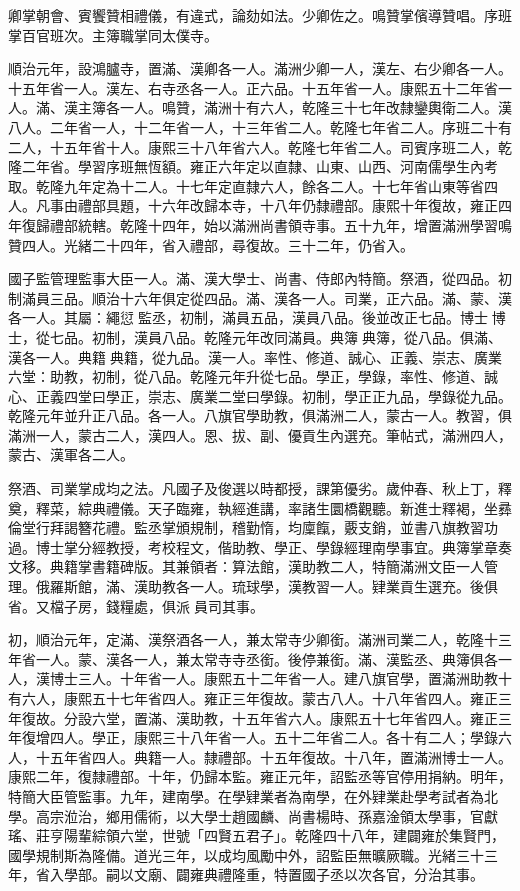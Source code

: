\begin{pinyinscope}
卿掌朝會、賓饗贊相禮儀，有違式，論劾如法。少卿佐之。鳴贊掌儐導贊唱。序班掌百官班次。主簿職掌同太僕寺。

順治元年，設鴻臚寺，置滿、漢卿各一人。滿洲少卿一人，漢左、右少卿各一人。十五年省一人。漢左、右寺丞各一人。正六品。十五年省一人。康熙五十二年省一人。滿、漢主簿各一人。鳴贊，滿洲十有六人，乾隆三十七年改隸鑾輿衛二人。漢八人。二年省一人，十二年省一人，十三年省二人。乾隆七年省二人。序班二十有二人，十五年省十人。康熙三十八年省六人。乾隆七年省二人。司賓序班二人，乾隆二年省。學習序班無恆額。雍正六年定以直隸、山東、山西、河南儒學生內考取。乾隆九年定為十二人。十七年定直隸六人，餘各二人。十七年省山東等省四人。凡事由禮部具題，十六年改歸本寺，十八年仍隸禮部。康熙十年復故，雍正四年復歸禮部統轄。乾隆十四年，始以滿洲尚書領寺事。五十九年，增置滿洲學習鳴贊四人。光緒二十四年，省入禮部，尋復故。三十二年，仍省入。

國子監管理監事大臣一人。滿、漢大學士、尚書、侍郎內特簡。祭酒，從四品。初制滿員三品。順治十六年俱定從四品。滿、漢各一人。司業，正六品。滿、蒙、漢各一人。其屬：繩愆監丞，初制，滿員五品，漢員八品。後並改正七品。博士博士，從七品。初制，漢員八品。乾隆元年改同滿員。典簿典簿，從八品。俱滿、漢各一人。典籍典籍，從九品。漢一人。率性、修道、誠心、正義、崇志、廣業六堂：助教，初制，從八品。乾隆元年升從七品。學正，學錄，率性、修道、誠心、正義四堂曰學正，崇志、廣業二堂曰學錄。初制，學正正九品，學錄從九品。乾隆元年並升正八品。各一人。八旗官學助教，俱滿洲二人，蒙古一人。教習，俱滿洲一人，蒙古二人，漢四人。恩、拔、副、優貢生內選充。筆帖式，滿洲四人，蒙古、漢軍各二人。

祭酒、司業掌成均之法。凡國子及俊選以時都授，課第優劣。歲仲春、秋上丁，釋奠，釋菜，綜典禮儀。天子臨雍，執經進講，率諸生圜橋觀聽。新進士釋褐，坐彞倫堂行拜謁簪花禮。監丞掌頒規制，稽勤惰，均廩餼，覈支銷，並書八旗教習功過。博士掌分經教授，考校程文，偕助教、學正、學錄經理南學事宜。典簿掌章奏文移。典籍掌書籍碑版。其兼領者：算法館，漢助教二人，特簡滿洲文臣一人管理。俄羅斯館，滿、漢助教各一人。琉球學，漢教習一人。肄業貢生選充。後俱省。又檔子房，錢糧處，俱派員司其事。

初，順治元年，定滿、漢祭酒各一人，兼太常寺少卿銜。滿洲司業二人，乾隆十三年省一人。蒙、漢各一人，兼太常寺寺丞銜。後停兼銜。滿、漢監丞、典簿俱各一人，漢博士三人。十年省一人。康熙五十二年省一人。建八旗官學，置滿洲助教十有六人，康熙五十七年省四人。雍正三年復故。蒙古八人。十八年省四人。雍正三年復故。分設六堂，置滿、漢助教，十五年省六人。康熙五十七年省四人。雍正三年復增四人。學正，康熙三十八年省一人。五十二年省二人。各十有二人；學錄六人，十五年省四人。典籍一人。隸禮部。十五年復故。十八年，置滿洲博士一人。康熙二年，復隸禮部。十年，仍歸本監。雍正元年，詔監丞等官停用捐納。明年，特簡大臣管監事。九年，建南學。在學肄業者為南學，在外肄業赴學考試者為北學。高宗涖治，鄉用儒術，以大學士趙國麟、尚書楊時、孫嘉淦領太學事，官獻瑤、莊亨陽輩綜領六堂，世號「四賢五君子」。乾隆四十八年，建闢雍於集賢門，國學規制斯為隆備。道光三年，以成均風勵中外，詔監臣無曠厥職。光緒三十三年，省入學部。嗣以文廟、闢雍典禮隆重，特置國子丞以次各官，分治其事。


\end{pinyinscope}
